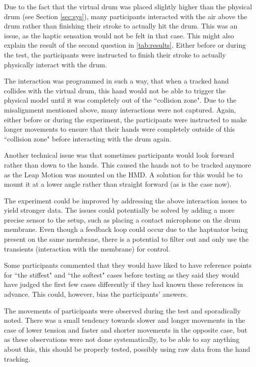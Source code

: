 \documentclass{article}
\begin{document}
Due to the fact that the virtual drum was placed slightly higher than the physical drum (see Section \ref{sec:sys}), many participants interacted with the air above the drum rather than finishing their stroke to actually hit the drum. This was an issue, as the haptic sensation would not be felt in that case. This might also explain the result of the second question in \autoref{tab:results}. Either before or during the test, the participants were instructed to finish their stroke to actually physically interact with the drum. 

The interaction was programmed in such a way, that when a tracked hand collides with the virtual drum, this hand would not be able to trigger the physical model until it was completely out of the ``collision zone". Due to the misalignment mentioned above, many interactions were not captured. Again, either before or during the experiment, the participants were instructed to make longer movements to ensure that their hands were completely outside of this ``collision zone" before interacting with the drum again.

Another technical issue was that sometimes participants would look forward rather than down to the hands. This caused the hands not to be tracked anymore as the Leap Motion was mounted on the HMD. A solution for this would be to mount it at a lower angle rather than straight forward (as is the case now).

The experiment could be improved by addressing the above interaction issues to yield stronger data. The issues could potentially be solved by adding a more precise sensor to the setup, such as placing a contact microphone on the drum membrane. Even though a feedback loop could occur due to the haptuator being present on the same membrane, there is a potential to filter out and only use the transients (interaction with the membrane) for control.

Some participants commented that they would have liked to have reference points for ``the stiffest" and ``the softest" cases before testing as they said they would have judged the first few cases differently if they had known these references in advance. This could, however, bias the participants' answers.

The movements of participants were observed during the test and sporadically noted. There was a small tendency towards slower and longer movements in the case of lower tension and faster and shorter movements in the opposite case, but as these observations were not done systematically, to be able to say anything about this, this should be properly tested, possibly using raw data from the hand tracking.
\end{document}
